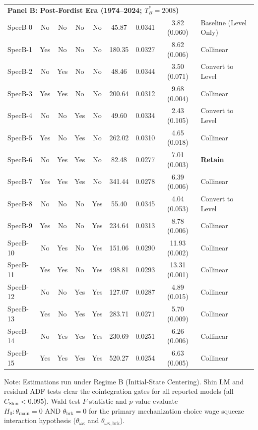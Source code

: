 \begin{table}[h!]
{\begin{tabular}{lcccccccl}
\midrule
\multicolumn{9}{l}{\textbf{Panel B: Post-Fordist Era (1974--2024; $T_B^* = 2008$)}} \\
SpecB-0 & No & No & No & No & 45.87 & 0.0341 & 3.82 (0.060) & Baseline (Level Only) \\
SpecB-1 & Yes & No & No & No & 180.35 & 0.0327 & 8.62 (0.006) & Collinear \\
SpecB-2 & No & Yes & No & No & 48.46 & 0.0344 & 3.50 (0.071) & Convert to Level \\
SpecB-3 & Yes & Yes & No & No & 200.64 & 0.0312 & 9.68 (0.004) & Collinear \\
SpecB-4 & No & No & Yes & No & 49.60 & 0.0334 & 2.43 (0.105) & Convert to Level \\
SpecB-5 & Yes & No & Yes & No & 262.02 & 0.0310 & 4.65 (0.018) & Collinear \\
SpecB-6 & No & Yes & Yes & No & 82.48 & 0.0277 & 7.01 (0.003) & \textbf{Retain} \\
SpecB-7 & Yes & Yes & Yes & No & 341.44 & 0.0278 & 6.39 (0.006) & Collinear \\
SpecB-8 & No & No & No & Yes & 55.40 & 0.0345 & 4.04 (0.053) & Convert to Level \\
SpecB-9 & Yes & No & No & Yes & 234.64 & 0.0313 & 8.78 (0.006) & Collinear \\
SpecB-10 & No & Yes & No & Yes & 151.06 & 0.0290 & 11.93 (0.002) & Collinear \\
SpecB-11 & Yes & Yes & No & Yes & 498.81 & 0.0293 & 13.31 (0.001) & Collinear \\
SpecB-12 & No & No & Yes & Yes & 127.07 & 0.0287 & 4.89 (0.015) & Collinear \\
SpecB-13 & Yes & No & Yes & Yes & 283.71 & 0.0271 & 5.70 (0.009) & Collinear \\
SpecB-14 & No & Yes & Yes & Yes & 230.69 & 0.0251 & 6.26 (0.006) & Collinear \\
SpecB-15 & Yes & Yes & Yes & Yes & 520.27 & 0.0254 & 6.63 (0.005) & Collinear \\
\bottomrule
\end{tabular}%
}
\vspace{4pt}
\begin{minipage}{\textwidth}
\footnotesize Note: Estimations run under Regime B (Initial-State Centering). Shin LM and residual ADF tests clear the cointegration gates for all reported models (all $C_{\text{Shin}} < 0.095$). Wald test $F$-statistic and $p$-value evaluate $H_0: \theta_{\text{main}} = 0 \text{ AND } \theta_{\text{brk}} = 0$ for the primary mechanization choice wage squeeze interaction hypothesis ($\theta_{\omega\kappa}$ and $\theta_{\omega\kappa,\text{brk}}$).
\end{minipage}
\end{table}
